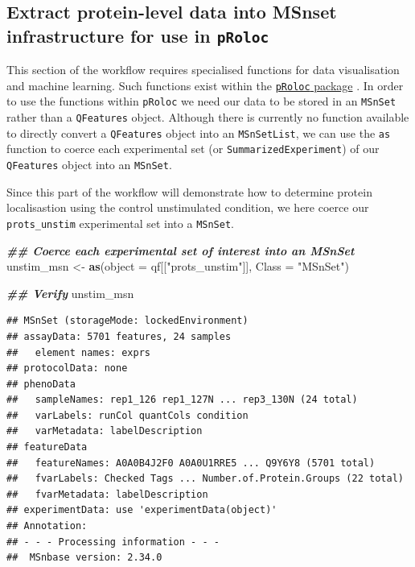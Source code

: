 \documentclass[9pt,a4paper,]{extarticle}
\newenvironment{Shaded}{\begin{snugshade}}{\end{snugshade}}
\newcommand{\AttributeTok}[1]{\textcolor[rgb]{0.13,0.29,0.53}{#1}}
\newcommand{\DocumentationTok}[1]{\textcolor[rgb]{0.56,0.35,0.01}{\textbf{\textit{#1}}}}
\newcommand{\FunctionTok}[1]{\textcolor[rgb]{0.13,0.29,0.53}{\textbf{#1}}}
\newcommand{\NormalTok}[1]{#1}
\newcommand{\OtherTok}[1]{\textcolor[rgb]{0.56,0.35,0.01}{#1}}
\newcommand{\StringTok}[1]{\textcolor[rgb]{0.31,0.60,0.02}{#1}}
\begin{document}
\subsection{\texorpdfstring{Extract protein-level data into MSnset infrastructure for use in \texttt{pRoloc}}{Extract protein-level data into MSnset infrastructure for use in pRoloc}}\label{extract-protein-level-data-into-msnset-infrastructure-for-use-in-proloc}

This section of the workflow requires specialised functions for data visualisation
and machine learning. Such functions exist within the \href{https://www.bioconductor.org/packages/release/bioc/html/pRoloc.html}{\texttt{pRoloc} package} \citep{pRoloc2014}.
In order to use the functions within \texttt{pRoloc} we need our data to be stored in
an \texttt{MSnSet} rather than a \texttt{QFeatures} object. Although there is currently no
function available to directly convert a \texttt{QFeatures} object into an \texttt{MSnSetList},
we can use the \texttt{as} function to coerce each experimental set (or \texttt{SummarizedExperiment})
of our \texttt{QFeatures} object into an \texttt{MSnSet}.

Since this part of the workflow will demonstrate how to determine protein
localisastion using the control unstimulated condition, we here coerce our
\texttt{prots\_unstim} experimental set into a \texttt{MSnSet}.

\begin{Shaded}
\begin{Highlighting}[]
\DocumentationTok{\#\# Coerce each experimental set of interest into an MSnSet}
\NormalTok{unstim\_msn }\OtherTok{\textless{}{-}} \FunctionTok{as}\NormalTok{(}\AttributeTok{object =}\NormalTok{ qf[[}\StringTok{"prots\_unstim"}\NormalTok{]], }\AttributeTok{Class =} \StringTok{"MSnSet"}\NormalTok{)}

\DocumentationTok{\#\# Verify}
\NormalTok{unstim\_msn}
\end{Highlighting}
\end{Shaded}

\begin{verbatim}
## MSnSet (storageMode: lockedEnvironment)
## assayData: 5701 features, 24 samples 
##   element names: exprs 
## protocolData: none
## phenoData
##   sampleNames: rep1_126 rep1_127N ... rep3_130N (24 total)
##   varLabels: runCol quantCols condition
##   varMetadata: labelDescription
## featureData
##   featureNames: A0A0B4J2F0 A0A0U1RRE5 ... Q9Y6Y8 (5701 total)
##   fvarLabels: Checked Tags ... Number.of.Protein.Groups (22 total)
##   fvarMetadata: labelDescription
## experimentData: use 'experimentData(object)'
## Annotation:  
## - - - Processing information - - -
##  MSnbase version: 2.34.0
\end{verbatim}
\end{document}
